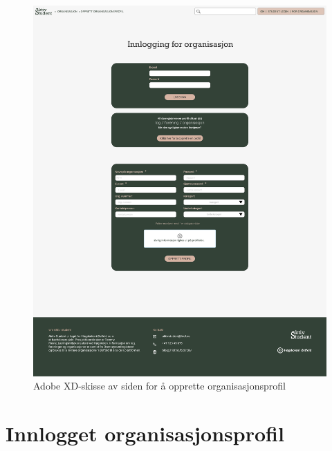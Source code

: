 \begin{figure}[H]
\centering
\includegraphics[width=\textwidth]{Illustrasjoner/Skisser-pdf/3.0/3-16-opprett-organisasjonsprofil.pdf}
\caption{Adobe XD-skisse av siden for å opprette organisasjonsprofil}
\label{vedlegg:3-16-opprett-orgprofil}
\end{figure}

\section{Innlogget organisasjonsprofil}

